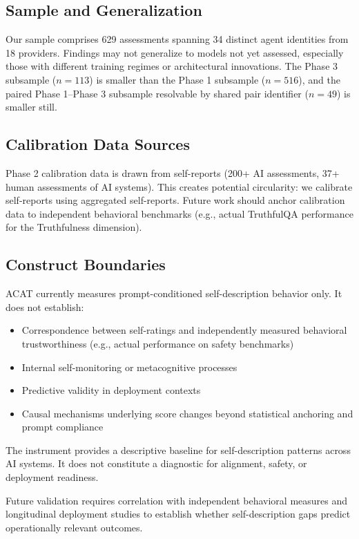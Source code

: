 \documentclass[11pt,a4paper]{article}
\begin{document}
\subsection{Sample and Generalization}

Our sample comprises 629 assessments spanning 34 distinct agent identities from 18 providers. Findings may not generalize to models not yet assessed, especially those with different training regimes or architectural innovations. The Phase 3 subsample ($n = 113$) is smaller than the Phase 1 subsample ($n = 516$), and the paired Phase 1--Phase 3 subsample resolvable by shared pair identifier ($n = 49$) is smaller still.

\subsection{Calibration Data Sources}

Phase 2 calibration data is drawn from self-reports (200+ AI assessments, 37+ human assessments of AI systems). This creates potential circularity: we calibrate self-reports using aggregated self-reports. Future work should anchor calibration data to independent behavioral benchmarks (e.g., actual TruthfulQA performance for the Truthfulness dimension).

\subsection{Construct Boundaries}

ACAT currently measures prompt-conditioned self-description behavior only. It does not establish:

\begin{itemize}
\item Correspondence between self-ratings and independently measured behavioral trustworthiness (e.g., actual performance on safety benchmarks)
\item Internal self-monitoring or metacognitive processes
\item Predictive validity in deployment contexts
\item Causal mechanisms underlying score changes beyond statistical anchoring and prompt compliance
\end{itemize}

The instrument provides a descriptive baseline for self-description patterns across AI systems. It does not constitute a diagnostic for alignment, safety, or deployment readiness.

Future validation requires correlation with independent behavioral measures and longitudinal deployment studies to establish whether self-description gaps predict operationally relevant outcomes.
\end{document}
